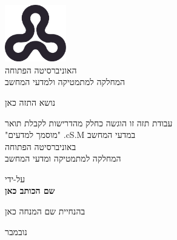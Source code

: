 \begin{titlepage}
    \begin{center}
        \vspace*{1cm}
        
        \includegraphics[width=0.2\textwidth]{ou_logo.png}\\
        האוניברסיטה הפתוחה\\
        המחלקה למתמטיקה ולמדעי המחשב
        \vspace{2cm}
        
        {\Large נושא התזה כאן}
        
        \vspace{1.5cm}

        עבודת תזה זו הוגשה כחלק מהדרישות לקבלת תואר
\\
        "מוסמך למדעים"
        .cS.M
        במדעי המחשב\\
        באוניברסיטה הפתוחה\\
        המחלקה למתמטיקה ומדעי המחשב
        
        \vspace{1cm}

        על-ידי\\
        \textbf{שם הכותב כאן}
        \vspace{1cm}
        
        בהנחיית שם המנחה כאן{}
        
        \vfill
        
        נובמבר%
        { \endL}
    \end{center}
\end{titlepage}